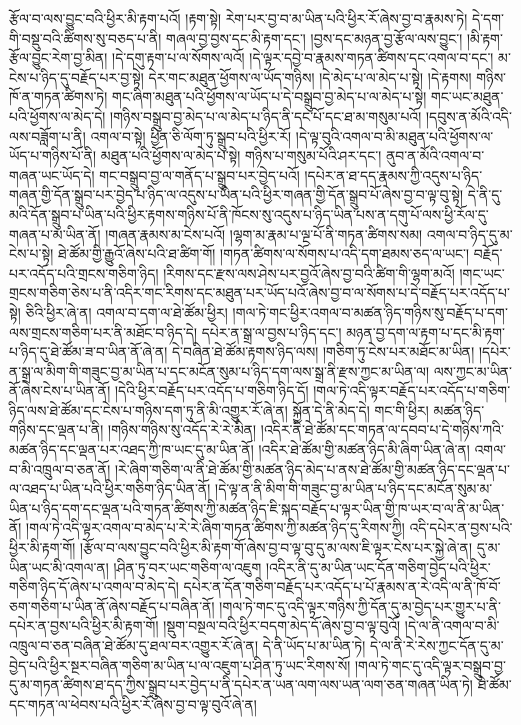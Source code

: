 རྩོལ་བ་ལས་བྱུང་བའི་ཕྱིར་མི་རྟག་པའོ། །རྟག་སྟེ། རེག་པར་བྱ་བ་མ་ཡིན་པའི་ཕྱིར་རོ་ཞེས་བྱ་བ་རྣམས་ཏེ། དེ་དག་གི་བསྡུ་བའི་ཚིགས་སུ་བཅད་པ་ནི། གཞལ་བྱ་བྱས་དང་མི་རྟག་དང་། །བྱས་དང་མཉན་བྱ་རྩོལ་ལས་བྱུང་། །མི་རྟག་རྩོལ་བྱུང་རེག་བྱ་མིན། །དེ་དགུ་རྟག་པ་ལ་སོགས་ལའོ། །དེ་ལྟར་དབྱེ་བ་རྣམས་གཏན་ཚིགས་དང་འགལ་བ་དང་། མ་ངེས་པ་ཉིད་དུ་བརྗོད་པར་བྱ་སྟེ། དེར་གང་མཐུན་ཕྱོགས་ལ་ཡོད་གཉིས། །དེ་མེད་པ་ལ་མེད་པ་སྟེ། །དེ་རྟགས། གཉིས་ཁོ་ན་གཏན་ཚིགས་ཏེ། གང་ཞིག་མཐུན་པའི་ཕྱོགས་ལ་ཡོད་པ་དེ་བསྒྲུབ་བྱ་མེད་པ་ལ་མེད་པ་སྟེ། གང་ཡང་མཐུན་པའི་ཕྱོགས་ལ་མེད་དེ། །གཉིས་བསྒྲུབ་བྱ་མེད་པ་ལ་མེད་པ་ཉིད་ནི་དང་པོ་དང་ཐ་མ་གསུམ་པའོ། །དབུས་ན་མོའི་འདི་ལས་བཟློག་པ་ནི། འགལ་བ་སྟེ། ཕྱིན་ཅི་ལོག་ཏུ་སྒྲུབ་པའི་ཕྱིར་རོ། །དེ་ལྟ་བུའི་འགལ་བ་མི་མཐུན་པའི་ཕྱོགས་ལ་ཡོད་པ་གཉིས་པོ་ནི། མཐུན་པའི་ཕྱོགས་ལ་མེད་པ་སྟེ། གཉིས་པ་གསུམ་པོའི་ཤར་དང་། ནུབ་ན་མོའི་འགལ་བ་གཞན་ཡང་ཡོད་དེ། གང་བསྒྲུབ་བྱ་ལ་གནོད་པ་སྒྲུབ་པར་བྱེད་པའོ། །དཔེར་ན་ཐ་དད་རྣམས་ཀྱི་འདུས་པ་ཉིད་གཞན་གྱི་དོན་སྒྲུབ་པར་བྱེད་པ་ཉིད་ལ་འདུས་པ་ཡིན་པའི་ཕྱིར་གཞན་གྱི་དོན་སྒྲུབ་པོ་ཞེས་བྱ་བ་ལྟ་བུ་སྟེ། དེ་ནི་དུ་མའི་དོན་སྒྲུབ་པ་ཡིན་པའི་ཕྱིར་རྟགས་གཉིས་པོ་ནི་ཁོངས་སུ་འདུས་པ་ཉིད་ཡིན་པས་ན་དགུ་པོ་ལས་ཕྱི་རོལ་དུ་གཞན་པ་མ་ཡིན་ནོ། །གཞན་རྣམས་མ་ངེས་པའོ། །ལྷག་མ་རྣམ་པ་ལྔ་པོ་ནི་གཏན་ཚིགས་སམ། འགལ་བ་ཉིད་དུ་མ་ངེས་པ་སྟེ། ཐེ་ཚོམ་གྱི་རྒྱུའོ་ཞེས་པའི་ཐ་ཚིག་གོ། །གཏན་ཚིགས་ལ་སོགས་པ་འདི་དག་ཐམས་ཅད་ལ་ཡང་། བརྗོད་པར་འདོད་པའི་གྲངས་གཅིག་ཉིད། །རིགས་དང་རྫས་ལས་ཤེས་པར་བྱའོ་ཞེས་བྱ་བའི་ཚིག་གི་ལྷག་མའོ། །གང་ཡང་གྲངས་གཅིག་ཅེས་པ་ནི་འདིར་གང་རིགས་དང་མཐུན་པར་ཡོད་པའོ་ཞེས་བྱ་བ་ལ་སོགས་པ་དེ་བརྗོད་པར་འདོད་པ་སྟེ། ཅིའི་ཕྱིར་ཞེ་ན། འགལ་བ་དག་ལ་ཐེ་ཚོམ་ཕྱིར། །གལ་ཏེ་གང་ཕྱིར་འགལ་བ་མཚན་ཉིད་གཉིས་སུ་བརྗོད་པ་དག་ལས་གྲངས་གཅིག་པར་ནི་མཐོང་བ་ཉིད་དེ། དཔེར་ན་སྒྲ་ལ་བྱས་པ་ཉིད་དང་། མཉན་བྱ་དག་ལ་རྟག་པ་དང་མི་རྟག་པ་ཉིད་དུ་ཐེ་ཚོམ་ཟ་བ་ཡིན་ནོ་ཞེ་ན། དེ་བཞིན་ཐེ་ཚོམ་རྟགས་ཉིད་ལས། །གཅིག་ཏུ་ངེས་པར་མཐོང་མ་ཡིན། །དཔེར་ན་སྒྲ་ལ་མིག་གི་གཟུང་བྱ་མ་ཡིན་པ་དང་མངོན་སུམ་པ་ཉིད་དག་ལས་སྒྲ་ནི་རྫས་ཀྱང་མ་ཡིན་ལ། ལས་ཀྱང་མ་ཡིན་ནོ་ཞེས་ངེས་པ་ཡིན་ནོ། །དེའི་ཕྱིར་བརྗོད་པར་འདོད་པ་གཅིག་ཉིད་དོ། །གལ་ཏེ་འདི་ལྟར་བརྗོད་པར་འདོད་པ་གཅིག་ཉིད་ལས་ཐེ་ཚོམ་དང་ངེས་པ་གཉིས་དག་ཏུ་ནི་མི་འགྱུར་རོ་ཞེ་ན། སྐྱོན་དེ་ནི་མེད་དེ། གང་གི་ཕྱིར། མཚན་ཉིད་གཉིས་དང་ལྡན་པ་ནི། །གཉིས་གཉིས་སུ་འདོད་རེ་རེ་མིན། །འདིར་ནི་ཐེ་ཚོམ་དང་གཏན་ལ་དབབ་པ་དེ་གཉིས་ཀའི་མཚན་ཉིད་དང་ལྡན་པར་འཐད་ཀྱི་ཁ་ཡང་དུ་མ་ཡིན་ནོ། །འདིར་ཐེ་ཚོམ་གྱི་མཚན་ཉིད་མི་ཞིག་ཡིན་ཞེ་ན། འགལ་བ་མི་འཁྲུལ་བ་ཅན་ནོ། །རེ་ཞིག་གཅིག་ལ་ནི་ཐེ་ཚོམ་གྱི་མཚན་ཉིད་མེད་པ་ནས་ཐེ་ཚོམ་གྱི་མཚན་ཉིད་དང་ལྡན་པ་ལ་འཐད་པ་ཡིན་པའི་ཕྱིར་གཅིག་ཉིད་ཡིན་ནོ། །དེ་ལྟ་ན་ནི་མིག་གི་གཟུང་བྱ་མ་ཡིན་པ་ཉིད་དང་མངོན་སུམ་མ་ཡིན་པ་ཉིད་དག་དང་ལྡན་པའི་གཏན་ཚིགས་ཀྱི་མཚན་ཉིད་ཇི་སྐད་བརྗོད་པ་ལྟར་ཡིན་གྱི་ཁ་ཡར་བ་ལ་ནི་མ་ཡིན་ནོ། །གལ་ཏེ་འདི་ལྟར་འགལ་བ་མེད་པ་རེ་རེ་ཞིག་གཏན་ཚིགས་ཀྱི་མཚན་ཉིད་དུ་རིགས་ཀྱི། འདི་དཔེར་ན་བྱས་པའི་ཕྱིར་མི་རྟག་གོ། །རྩོལ་བ་ལས་བྱུང་བའི་ཕྱིར་མི་རྟག་གོ་ཞེས་བྱ་བ་ལྟ་བུ་དུ་མ་ལས་ཇི་ལྟར་ངེས་པར་སྐྱེ་ཞེ་ན། དུ་མ་ཡིན་ཡང་མི་འགལ་ན། །ཤིན་ཏུ་བར་ཡང་གཅིག་ལ་འཇུག །འདིར་ནི་དུ་མ་ཡིན་ཡང་དོན་གཅིག་བྱེད་པའི་ཕྱིར་གཅིག་ཉིད་དོ་ཞེས་པ་འགལ་བ་མེད་དེ། དཔེར་ན་དོན་གཅིག་བརྗོད་པར་འདོད་པ་པོ་རྣམས་ན་རེ་འདི་ལ་ནི་ཁོ་བོ་ཅག་གཅིག་པ་ཡིན་ནོ་ཞེས་བརྗོད་པ་བཞིན་ནོ། །གལ་ཏེ་གང་དུ་འདི་ལྟར་གཉིས་ཀྱི་དོན་དུ་མ་བྱེད་པར་གྱུར་པ་ནི་དཔེར་ན་བྱས་པའི་ཕྱིར་མི་རྟག་གོ། །སྡུག་བསྔལ་བའི་ཕྱིར་བདག་མེད་དོ་ཞེས་བྱ་བ་ལྟ་བུའོ། །དེ་ལ་ནི་འགལ་བ་མི་འཁྲུལ་བ་ཅན་བཞིན་ཐེ་ཚོམ་དུ་ཐལ་བར་འགྱུར་རོ་ཞེ་ན། དེ་ནི་ཡོད་པ་མ་ཡིན་ཏེ། དེ་ལ་ནི་རེ་རེས་ཀྱང་དོན་དུ་མ་བྱེད་པའི་ཕྱིར་སྔར་བཞིན་གཅིག་མ་ཡིན་པ་ལ་འཇུག་པ་ཤིན་ཏུ་ཡང་རིགས་སོ། །གལ་ཏེ་གང་དུ་འདི་ལྟར་བསྒྲུབ་བྱ་དུ་མ་གཏན་ཚིགས་ཐ་དད་ཀྱིས་སྒྲུབ་པར་བྱེད་པ་ནི་དཔེར་ན་ཡན་ལག་ལས་ཡན་ལག་ཅན་གཞན་ཡིན་ཏེ། ཐེ་ཚོམ་དང་གཏན་ལ་ཕེབས་པའི་ཕྱིར་རོ་ཞེས་བྱ་བ་ལྟ་བུའོ་ཞེ་ན། 